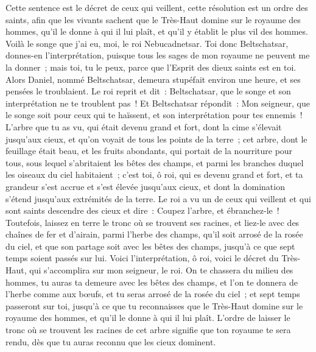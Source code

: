 \begin{multicols}{2}
Cette sentence est le décret de ceux qui veillent, cette résolution est un ordre des saints, afin que les vivants sachent que le Très-Haut domine sur le royaume des hommes, qu'il le donne à qui il lui plaît, et qu'il y établit le plus vil des hommes.
Voilà le songe que j'ai eu, moi, le roi Nebucadnetsar. Toi donc Beltschatsar, donnes-en l'interprétation, puisque tous les sages de mon royaume ne peuvent me la donner~; mais toi, tu le peux, parce que l'Esprit des dieux saints est en toi.
Alors Daniel, nommé Beltschatsar, demeura stupéfait environ une heure, et ses pensées le troublaient. Le roi reprit et dit~: Beltschatsar, que le songe et son interprétation ne te troublent pas~! Et Beltschatsar répondit~: Mon seigneur, que le songe soit pour ceux qui te haïssent, et son interprétation pour tes ennemis~!
L'arbre que tu as vu, qui était devenu grand et fort, dont la cime s'élevait jusqu'aux cieux, et qu'on voyait de tous les points de la terre~;
cet arbre, dont le feuillage était beau, et les fruits abondants, qui portait de la nourriture pour tous, sous lequel s'abritaient les bêtes des champs, et parmi les branches duquel les oiseaux du ciel habitaient~;
c'est toi, ô roi, qui es devenu grand et fort, et ta grandeur s'est accrue et s'est élevée jusqu'aux cieux, et dont la domination s'étend jusqu'aux extrémités de la terre.
Le roi a vu un de ceux qui veillent et qui sont saints descendre des cieux et dire~: Coupez l'arbre, et ébranchez-le~! Toutefois, laissez en terre le tronc où se trouvent ses racines, et liez-le avec des chaînes de fer et d'airain, parmi l'herbe des champs, qu'il soit arrosé de la rosée du ciel, et que son partage soit avec les bêtes des champs, jusqu'à ce que sept temps soient passés sur lui.
Voici l'interprétation, ô roi, voici le décret du Très-Haut, qui s'accomplira sur mon seigneur, le roi.
On te chassera du milieu des hommes, tu auras ta demeure avec les bêtes des champs, et l'on te donnera de l'herbe comme aux bœufs, et tu seras arrosé de la rosée du ciel~; et sept temps passeront sur toi, jusqu'à ce que tu reconnaisses que le Très-Haut domine sur le royaume des hommes, et qu'il le donne à qui il lui plaît.
L'ordre de laisser le tronc où se trouvent les racines de cet arbre signifie que ton royaume te sera rendu, dès que tu auras reconnu que les cieux dominent.

\end{multicols}
